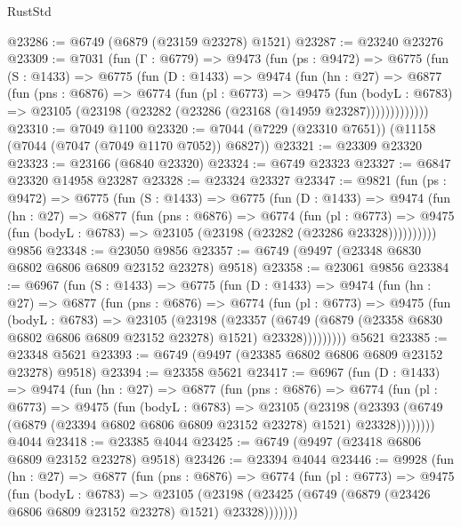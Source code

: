 \begin{lexlean}{RustStd}
\begin{coremodule}
@23286 := @6749 (@6879 (@23159 @23278) @1521)
@23287 := @23240 @23276
@23309 := @7031
    (fun (Γ : @6779) =>
    @9473
      (fun (ps : @9472) =>
      @6775
        (fun (S : @1433) =>
        @6775
          (fun (D : @1433) =>
          @9474
            (fun (hn : @27) =>
            @6877
              (fun (pns : @6876) =>
              @6774
                (fun (pl : @6773) =>
                @9475
                  (fun (bodyL : @6783) =>
                  @23105 (@23198 (@23282 (@23286 (@23168 (@14959 @23287)))))))))))))
@23310 := @7049 @1100
@23320 := @7044 (@7229 (@23310 @7651)) (@11158 (@7044 (@7047 (@7049 @1170 @7052)) @6827))
@23321 := @23309 @23320
@23323 := @23166 (@6840 @23320)
@23324 := @6749 @23323
@23327 := @6847 @23320 @14958 @23287
@23328 := @23324 @23327
@23347 := @9821
    (fun (ps : @9472) =>
    @6775
      (fun (S : @1433) =>
      @6775
        (fun (D : @1433) =>
        @9474
          (fun (hn : @27) =>
          @6877
            (fun (pns : @6876) =>
            @6774
              (fun (pl : @6773) =>
              @9475 (fun (bodyL : @6783) => @23105 (@23198 (@23282 (@23286 @23328))))))))))
    @9856
@23348 := @23050 @9856
@23357 := @6749 (@9497 (@23348 @6830 @6802 @6806 @6809 @23152 @23278) @9518)
@23358 := @23061 @9856
@23384 := @6967
    (fun (S : @1433) =>
    @6775
      (fun (D : @1433) =>
      @9474
        (fun (hn : @27) =>
        @6877
          (fun (pns : @6876) =>
          @6774
            (fun (pl : @6773) =>
            @9475
              (fun (bodyL : @6783) =>
              @23105
                (@23198
                  (@23357
                    (@6749
                      (@6879 (@23358 @6830 @6802 @6806 @6809 @23152 @23278) @1521)
                      @23328)))))))))
    @5621
@23385 := @23348 @5621
@23393 := @6749 (@9497 (@23385 @6802 @6806 @6809 @23152 @23278) @9518)
@23394 := @23358 @5621
@23417 := @6967
    (fun (D : @1433) =>
    @9474
      (fun (hn : @27) =>
      @6877
        (fun (pns : @6876) =>
        @6774
          (fun (pl : @6773) =>
          @9475
            (fun (bodyL : @6783) =>
            @23105
              (@23198
                (@23393 (@6749 (@6879 (@23394 @6802 @6806 @6809 @23152 @23278) @1521) @23328))))))))
    @4044
@23418 := @23385 @4044
@23425 := @6749 (@9497 (@23418 @6806 @6809 @23152 @23278) @9518)
@23426 := @23394 @4044
@23446 := @9928
    (fun (hn : @27) =>
    @6877
      (fun (pns : @6876) =>
      @6774
        (fun (pl : @6773) =>
        @9475
          (fun (bodyL : @6783) =>
          @23105
            (@23198 (@23425 (@6749 (@6879 (@23426 @6806 @6809 @23152 @23278) @1521) @23328)))))))

\end{coremodule}
\end{lexlean}
